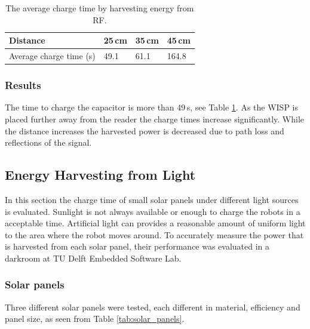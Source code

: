 \begin{table}[t]
	\centering
	\caption{The average charge time by harvesting energy from RF.}
	\label{tab:res_rf_harvest}
	\begin{tabular}{|l||l|l|l|}
		\hline
		Distance & 25\,cm & 35\,cm & 45\,cm \\
		\hline \hline
		Average charge time (s) & 49.1 & 61.1 & 164.8 \\
		\hline
	\end{tabular}
\end{table}

\subsubsection{Results}
The time to charge the capacitor is more than 49\,s, see Table \ref{tab:res_rf_harvest}.
As the WISP is placed further away from the reader the charge times increase significantly.
While the distance increases the harvested power is decreased due to path loss and reflections of the signal.

\subsection{Energy Harvesting from Light}

In this section the charge time of small solar panels under different light sources is evaluated.
Sunlight is not always available or enough to charge the robots in a acceptable time.
Artificial light can provides a reasonable amount of uniform light to the area where the robot moves around.
To accurately measure the power that is harvested from each solar panel, their performance was evaluated in a darkroom at TU Delft Embedded Software Lab.

\subsubsection{Solar panels}
Three different solar panels were tested, each different in material, efficiency and panel size, as seen from Table \ref{tab:solar_panels}.

